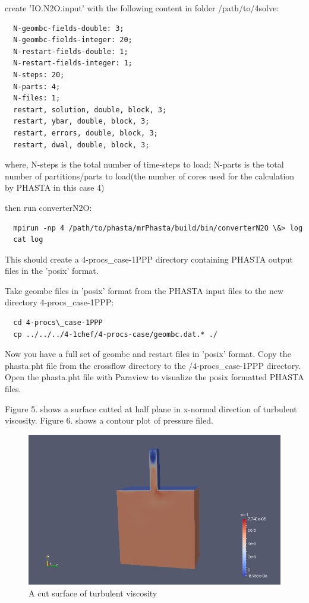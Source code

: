 \documentclass{article}
\begin{document}
create 'IO.N2O.input' with the following content in folder /path/to/4solve:
   \begin{lstlisting}
  N-geombc-fields-double: 3;
  N-geombc-fields-integer: 20;
  N-restart-fields-double: 1;
  N-restart-fields-integer: 1;
  N-steps: 20;
  N-parts: 4;
  N-files: 1;
  restart, solution, double, block, 3;
  restart, ybar, double, block, 3;
  restart, errors, double, block, 3;
  restart, dwal, double, block, 3;
    \end{lstlisting}

where, N-steps is the total number of time-steps to load; N-parts is the total number of partitions/parts to load(the number of cores used for the calculation by PHASTA in this case 4)

then run converterN2O:
  \begin{lstlisting}
  mpirun -np 4 /path/to/phasta/mrPhasta/build/bin/converterN2O \&> log
  cat log
    \end{lstlisting}

This should create a 4-procs\_case-1PPP directory containing PHASTA output files in the 'posix' format.

Take geombc files in 'posix' format from the PHASTA input files to the new directory 4-procs\_case-1PPP:

  \begin{lstlisting}
  cd 4-procs\_case-1PPP
  cp ../../../4-1chef/4-procs-case/geombc.dat.* ./
    \end{lstlisting}

Now you have a full set of geombc and restart files in 'posix' format. Copy the phasta.pht file from the crossflow directory to the /4-procs\_case-1PPP directory. Open the phasta.pht file with Paraview to visualize the posix formatted PHASTA files.

Figure 5. shows a surface cutted at half plane in x-normal direction of turbulent viscosity. Figure 6. shows a contour plot of pressure filed.

\begin{figure}[h!]
  \centering
    \includegraphics[width=1\textwidth]{res1}
  \caption{A cut surface of turbulent viscosity}
\end{figure}
\end{document}

